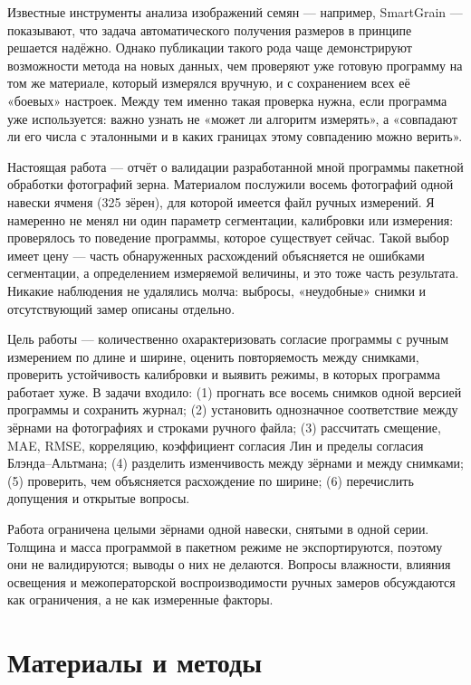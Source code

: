 \documentclass[12pt,a4paper]{article}
\begin{document}
Известные инструменты анализа изображений семян — например, SmartGrain
\cite{tanabata2012} — показывают, что задача автоматического получения
размеров в принципе решается надёжно. Однако публикации такого рода чаще
демонстрируют возможности метода на новых данных, чем проверяют уже
готовую программу на том же материале, который измерялся вручную, и с
сохранением всех её «боевых» настроек. Между тем именно такая проверка
нужна, если программа уже используется: важно узнать не «может ли
алгоритм измерять», а «совпадают ли его числа с эталонными и в каких
границах этому совпадению можно верить».

Настоящая работа — отчёт о валидации разработанной мной программы
пакетной обработки фотографий зерна. Материалом послужили восемь
фотографий одной навески ячменя (325 зёрен), для которой имеется файл
ручных измерений. Я намеренно не менял ни один параметр сегментации,
калибровки или измерения: проверялось то поведение программы, которое
существует сейчас. Такой выбор имеет цену — часть обнаруженных
расхождений объясняется не ошибками сегментации, а определением
измеряемой величины, и это тоже часть результата. Никакие наблюдения не
удалялись молча: выбросы, «неудобные» снимки и отсутствующий замер
описаны отдельно.

Цель работы — количественно охарактеризовать согласие программы с ручным
измерением по длине и ширине, оценить повторяемость между снимками,
проверить устойчивость калибровки и выявить режимы, в которых программа
работает хуже. В задачи входило: (1) прогнать все восемь снимков одной
версией программы и сохранить журнал; (2) установить однозначное
соответствие между зёрнами на фотографиях и строками ручного файла;
(3) рассчитать смещение, MAE, RMSE, корреляцию, коэффициент согласия
Лин и пределы согласия Блэнда--Альтмана; (4) разделить изменчивость
между зёрнами и между снимками; (5) проверить, чем объясняется
расхождение по ширине; (6) перечислить допущения и открытые вопросы.

Работа ограничена целыми зёрнами одной навески, снятыми в одной серии.
Толщина и масса программой в пакетном режиме не экспортируются, поэтому
они не валидируются; выводы о них не делаются. Вопросы влажности,
влияния освещения и межоператорской воспроизводимости ручных замеров
обсуждаются как ограничения, а не как измеренные факторы.

\section{Материалы и методы}
\end{document}
